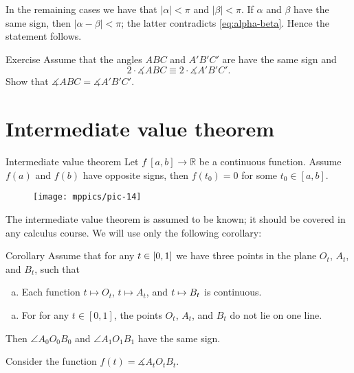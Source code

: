 In the remaining cases we have that $|\alpha|<\pi$ and $|\beta|<\pi$.
If $\alpha$ and $\beta$ have the same sign, then $|\alpha-\beta|<\pi$;
the latter contradicts \ref{eq:alpha-beta}.
Hence the statement follows.
\qeds

\begin{thm}{Exercise}\label{ex:PP(PN)}
Assume that the angles $ABC$ and $A'B'C'$ are have the same sign
and 
\[2\cdot \measuredangle ABC\equiv 2\cdot \measuredangle A'B'C'.\]
Show that $\measuredangle ABC= \measuredangle A'B'C'$.
\end{thm}

\section*{Intermediate value theorem}

\begin{thm}{Intermediate value theorem}\label{thm:intermidiate}
Let $f\:[a,b]\to \mathbb{R}$ be a continuous function.
Assume 
$f(a)$ and $f(b)$ have opposite signs,
then $f(t_0)=0$ for some $t_0\in[a,b]$.
\end{thm}

\begin{wrapfigure}{r}{38mm}
\vskip-6mm
\centering
\texttt{[image: mppics/pic-14]}
\end{wrapfigure}

The intermediate value theorem is assumed to be known;
it should be covered in any calculus course.
We will use only the following corollary:

\begin{thm}[\abs]{Corollary}\label{cor:intermidiate}
Assume that for any $t\z\in [0,1]$ we have three points in the plane  $O_t$, $A_t$, and $B_t$, such that 
\begin{enumerate}[(a)]
\item Each function $t\mapsto O_t$, $t\mapsto A_t$, and $t\z\mapsto B_t$ is continuous.
\end{enumerate}

\begin{enumerate}[(a)]\addtocounter{enumi}{1}
\item For for any $t\in [0,1]$, the points $O_t$, $A_t$, and $B_t$ do not lie on one line.  
\end{enumerate}
Then $\angle A_0O_0B_0$ and $\angle A_1O_1B_1$ have the same sign.
\end{thm}

Consider the function 
$f(t)=\measuredangle A_tO_tB_t$.

